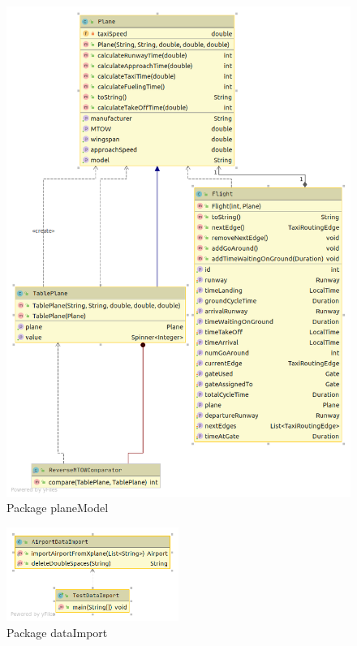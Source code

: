 \documentclass[a4paper, 12pt]{article}
\begin{document}
\begin{figure}[H]
\caption{Package planeModel}
 \label{fig:planeModel}
\hfill \includegraphics[height=\textheight]{resources/images/UML/Package planeModel.png} \hspace*{\fill}
\end{figure}

\begin{figure}[H]
\caption{Package dataImport}
 \label{fig:dataImport}
\hfill \includegraphics[width=0.5\textwidth]{resources/images/UML/Package dataImport.png} \hspace*{\fill}
\end{figure}
\end{document}
